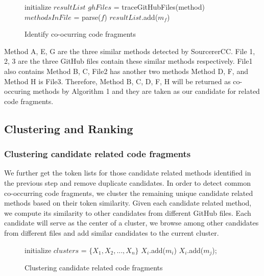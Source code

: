 \begin{figure}[h]
		\label{alg: co-occur}
 \removelatexerror
\begin{algorithm}[H]
	\caption{Identify co-ocurring code fragments}
	initialize $resultList$\;
	{
		$ghFiles$ = traceGitHubFiles(method) \;
		{
			$methodsInFile$ = parse($f$)\;
			{
				{
					$resultList$.add($m_f$) \;
				}
			}
		} 
	}
\end{algorithm}
\end{figure}

{\ttt Method A, E, G} are the three similar methods detected by SourcererCC. {\ttt File 1, 2, 3} are the three GitHub files contain these similar methods respectively. 
{\ttt File1} also contains {\ttt Method B, C}, {\ttt File2} has another two methods {\ttt Method D, F}, and {\ttt Method H} is {\ttt File3}. Therefore, {\ttt Method B, C, D, F, H} will be returned as co-occuring methods by Algorithm 1 and they are taken as our candidate for related code fragments.

\subsection{Clustering and Ranking}
\subsubsection{Clustering candidate related code fragments}
We further get the token lists for those candidate related methods identified in the previous step and remove duplicate candidates. In order to detect common co-occurring code fragments, we cluster the remaining unique candidate related methods
based on their token similarity.  Given each candidate related method, we compute its similarity to other candidates from different GitHub files. Each candidate will serve as the center of a cluster, we browse among other candidates from different files and add similar candidates to the current cluster.

\begin{figure}[h]
	\label{alg: Clustering candidate related methods}
	\removelatexerror
	\begin{algorithm}[H]
		\caption{Clustering candidate related code fragments}
		initialize $clusters$ = $\{X_1, X_2,..., X_n\}$\;
		{
			$X_i$.add($m_i$) \;
			{
				{
					{
						$X_i$.add($m_j$);
					}
				}
			} 
		}
	\end{algorithm}
\end{figure}

